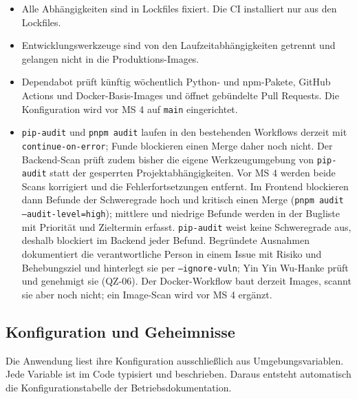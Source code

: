\documentclass[11pt,a4paper]{article}
\begin{document}
\begin{itemize}
\item Alle Abhängigkeiten sind in Lockfiles fixiert. Die CI installiert nur aus den Lockfiles.
\item Entwicklungswerkzeuge sind von den Laufzeitabhängigkeiten getrennt und gelangen nicht in die Produktions-Images.
\item Dependabot prüft künftig wöchentlich Python- und npm-Pakete, GitHub Actions und Docker-Basis-Images und öffnet gebündelte Pull Requests. Die Konfiguration wird vor MS 4 auf \texttt{main} eingerichtet.
\item \texttt{pip-audit} und \texttt{pnpm audit} laufen in den bestehenden Workflows derzeit mit \texttt{continue-on-error}; Funde blockieren einen Merge daher noch nicht. Der Backend-Scan prüft zudem bisher die eigene Werkzeugumgebung von \texttt{pip-audit} statt der gesperrten Projektabhängigkeiten. Vor MS 4 werden beide Scans korrigiert und die Fehlerfortsetzungen entfernt. Im Frontend blockieren dann Befunde der Schweregrade hoch und kritisch einen Merge (\texttt{pnpm audit --audit-level=high}); mittlere und niedrige Befunde werden in der Bugliste mit Priorität und Zieltermin erfasst. \texttt{pip-audit} weist keine Schweregrade aus, deshalb blockiert im Backend jeder Befund. Begründete Ausnahmen dokumentiert die verantwortliche Person in einem Issue mit Risiko und Behebungsziel und hinterlegt sie per \texttt{--ignore-vuln}; Yin Yin Wu-Hanke prüft und genehmigt sie (QZ-06). Der Docker-Workflow baut derzeit Images, scannt sie aber noch nicht; ein Image-Scan wird vor MS 4 ergänzt.
\end{itemize}


\subsection{Konfiguration und Geheimnisse}

Die Anwendung liest ihre Konfiguration ausschließlich aus Umgebungsvariablen. Jede Variable ist im Code typisiert und beschrieben. Daraus entsteht automatisch die Konfigurationstabelle der Betriebsdokumentation.
\end{document}
